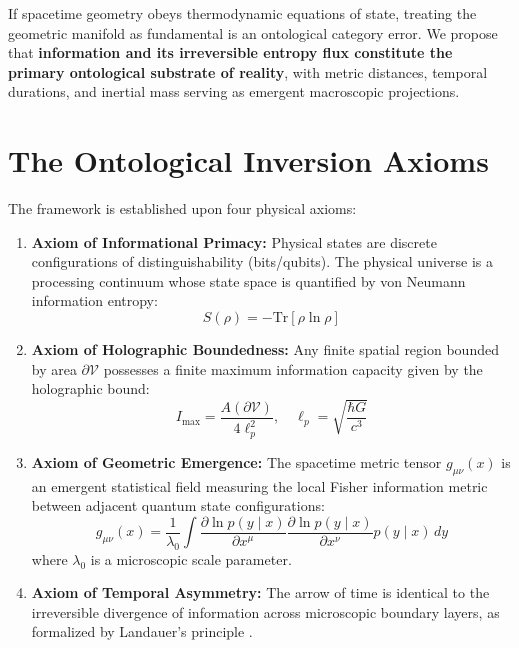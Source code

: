 \documentclass[11pt,a4paper]{article}
\begin{document}
If spacetime geometry obeys thermodynamic equations of state, treating the geometric manifold as fundamental is an ontological category error. We propose that \textbf{information and its irreversible entropy flux constitute the primary ontological substrate of reality}, with metric distances, temporal durations, and inertial mass serving as emergent macroscopic projections.

\section{The Ontological Inversion Axioms}
The framework is established upon four physical axioms:
\begin{enumerate}
    \item \textbf{Axiom of Informational Primacy:} Physical states are discrete configurations of distinguishability (bits/qubits). The physical universe is a processing continuum whose state space is quantified by von Neumann information entropy:
    \begin{equation}
    S(\rho) = -\text{Tr}[\rho \ln \rho]
    \end{equation}
    \item \textbf{Axiom of Holographic Boundedness:} Any finite spatial region bounded by area $\partial \mathcal{V}$ possesses a finite maximum information capacity given by the holographic bound:
    \begin{equation}
    I_{\text{max}} = \frac{A(\partial \mathcal{V})}{4 \ell_p^2}, \quad \ell_p = \sqrt{\frac{\hbar G}{c^3}}
    \end{equation}
    \item \textbf{Axiom of Geometric Emergence:} The spacetime metric tensor $g_{\mu\nu}(x)$ is an emergent statistical field measuring the local Fisher information metric between adjacent quantum state configurations:
    \begin{equation}
    g_{\mu\nu}(x) = \frac{1}{\lambda_0} \int \frac{\partial \ln p(y \mid x)}{\partial x^\mu} \frac{\partial \ln p(y \mid x)}{\partial x^\nu} p(y \mid x)\, dy
    \end{equation}
    where $\lambda_0$ is a microscopic scale parameter.
    \item \textbf{Axiom of Temporal Asymmetry:} The arrow of time is identical to the irreversible divergence of information across microscopic boundary layers, as formalized by Landauer's principle \cite{landauer1961irreversibility}.
\end{enumerate}
\end{document}
